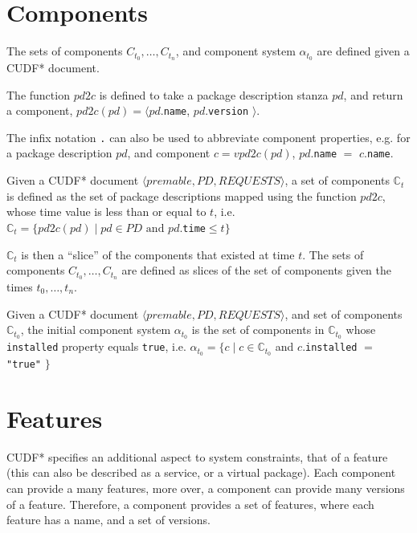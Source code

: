 \section{Components}
The sets of components $C_{t_0},\ldots,C_{t_n}$, and component system $\alpha_{t_{0}}$ are defined given a CUDF* document.

\begin{defs}
The function $pd2c$ is defined to take a package description stanza $pd$, and return a component, $pd2c(pd) = \langle pd.$\texttt{name}, $pd.$\texttt{version} $\rangle$.
\end{defs}

The infix notation \texttt{.} can also be used to abbreviate component properties, e.g. for a package description $pd$, and component $c = vpd2c(pd)$, $pd$.\texttt{name} $=$ $c$.\texttt{name}.

\begin{defs}
Given a CUDF* document $\langle premable, PD, REQUESTS \rangle$, a set of components $\mathbb{C}_{t}$ is defined as the set of package descriptions mapped using the function $pd2c$,
whose time value is less than or equal to $t$,
i.e. $\mathbb{C}_{t} = \{pd2c(pd) \mid pd \in PD \text{ and } pd$.\texttt{time}$ \leq t\}$
\end{defs}
$\mathbb{C}_{t}$ is then a ``slice'' of the components that existed at time $t$.
The sets of components $C_{t_0},\ldots,C_{t_n}$ are defined as slices of the set of components given the times $t_0,\ldots,t_n$.

\begin{defs}
Given a CUDF* document $\langle premable, PD, REQUESTS \rangle$, and set of components $\mathbb{C}_{t_0}$,
the initial component system $\alpha_{t_0}$ is the set of components in $\mathbb{C}_{t_0}$ whose \texttt{installed} property equals \texttt{true},
i.e. $\alpha_{t_{0}} = \{c \mid c \in \mathbb{C}_{t_0} $ and $ c.$\texttt{installed} $=$ \texttt{"true"} $\}$
\end{defs}

\section{Features}
CUDF* specifies an additional aspect to system constraints, that of a feature (this can also be described as a service, or a virtual package).
Each component can provide a many features, more over, a component can provide many versions of a feature.
Therefore, a component provides a set of features, where each feature has a name, and a set of versions.

